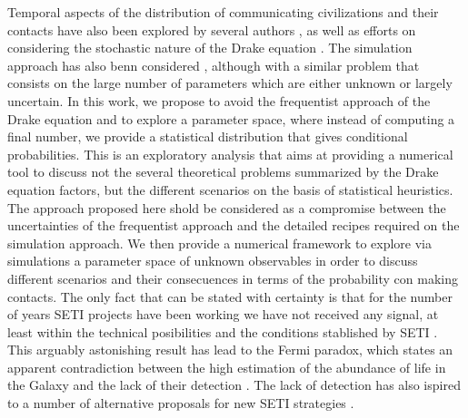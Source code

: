\documentclass[crop]{CSLB}
\begin{document}
Temporal aspects of the distribution of communicating civilizations
and their contacts have also been explored by several authors
\citep{fogg_temporal_1987, forgan_spatiotemporal_2011,
balbi_impact_2018, balb_spatiotemporal_2018, horvat_impact_2011},
%
as well as efforts on considering the stochastic nature of the Drake equation
\citep{glade_stochastic_2011}.
%
The simulation approach has also benn considered
\citep{forgan_evaluating_2015, vukotic_grandeur_2016,
murante_simulating_2015, forgan_numerical_2009, forgan_galactic_2017},
although with a similar problem that consists on the large number of
parameters which are either unknown or largely uncertain.
%
%
%
In this work, we propose to
avoid the frequentist approach of the Drake equation and to explore a
parameter space, where instead of computing a final number, we provide
a statistical distribution that gives conditional probabilities.
%
This is an exploratory analysis that aims at providing a numerical 
tool to discuss not the several theoretical problems summarized by the
Drake equation factors, 
but the different scenarios on the basis of statistical heuristics.
%
The approach proposed here shold be considered as a compromise between
the uncertainties of the frequentist approach and the detailed recipes
required on the simulation approach.
%
We then provide a numerical framework to explore via simulations a
parameter space of unknown observables in order to discuss different
scenarios and their consecuences in terms of the probability con
making contacts.
%
The only fact that can be stated with certainty is that for the number
of years SETI projects have been working we have not received any
signal, at least
within the technical posibilities and the 
conditions stablished by SETI \citep{tarter_search_2001}.
%
This arguably astonishing result has lead to the Fermi paradox, which
states an apparent contradiction between the high estimation of the
abundance of life in the Galaxy and the lack of their detection
\citep{vanhouten_isthere_2017}.
%
The lack of detection has also ispired to a number of alternative proposals
for new SETI strategies \citep{forgan_exoplanet_2017,
balbi_impact_2018, loeb_eavesdropping_2006, maccone_KLT_2010,
tarter_advancing_2009, enriquez_breakthrough_2017, loeb_relative_2016,
maccone_SETI_2011,  lingam_relative_2019, wright_theGsearch_2015,
maccone_SETI_2013, maccone_lognormals_2014, harp_application_2018,
forgan_possibility_2013, forgan_galactic_2017, funes_searching_2019}.
 
\end{document}
